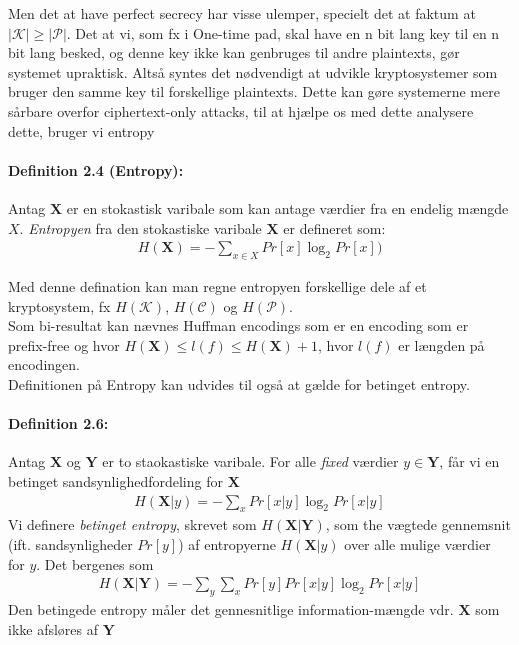 \documentclass[paper=a4, fontsize=11pt]{scrartcl} %
\numberwithin{equation}{section} %
\numberwithin{figure}{section} %
\numberwithin{table}{section} %
\begin{document}
	Men det at have perfect secrecy har visse ulemper, specielt det at faktum at $|\mathcal{K}|\geq|\mathcal{P}|$. Det at vi, som fx i One-time pad, skal have en n bit lang key til en n bit lang besked, og denne key ikke kan genbruges til andre plaintexts, gør systemet upraktisk. Altså syntes det nødvendigt at udvikle kryptosystemer som bruger den samme key til forskellige plaintexts. Dette kan gøre systemerne mere sårbare overfor ciphertext-only attacks, til at hjælpe os med dette analysere dette, bruger vi entropy
	
	\paragraph{\textbf{Definition 2.4 (Entropy):}} Antag $\mathbf{X}$ er en stokastisk varibale som kan antage værdier fra en endelig mængde $X$. \textit{Entropyen} fra den stokastiske varibale $\mathbf{X}$ er defineret som:
	\begin{align*}
	H(\mathbf{X})=-\sum_{x\in X}Pr[x]\log_2 Pr[x])
	\end{align*}
	
	Med denne defination kan man regne entropyen forskellige dele af et kryptosystem, fx $H(\mathcal{K})$, $H(\mathcal{C})$ og $H(\mathcal{P})$. \\
	
	Som bi-resultat kan nævnes Huffman encodings som er en encoding som er prefix-free og hvor $H(\mathbf{X})\leq l(f)\leq H(\mathbf{X}) + 1$, hvor $l(f)$ er længden på encodingen. \\
	
	Definitionen på Entropy kan udvides til også at gælde for betinget entropy.
	
	\paragraph{\textbf{Definition 2.6:}} Antag $\mathbf{X}$ og $\mathbf{Y}$ er to staokastiske varibale. For alle \textit{fixed} værdier $y\in\mathbf{Y}$, får vi en betinget sandsynlighedfordeling for $\mathbf{X}$
	\begin{align*}
	H(\mathbf{X}|y)=-\sum_x Pr[x|y]\log_2 Pr[x|y]
	\end{align*}
	Vi definere \textit{betinget entropy}, skrevet som $H(\mathbf{X}|\mathbf{Y})$, som the vægtede gennemsnit (ift. sandsynligheder $Pr[y]$) af entropyerne $H(\mathbf{X}|y)$ over alle mulige værdier for $y$. Det bergenes som
	\begin{align*}
	H(\mathbf{X}|\mathbf{Y})=-\sum_y \sum_x Pr[y]Pr[x|y]\log_2 Pr[x|y]
	\end{align*}
	Den betingede entropy måler det gennesnitlige information-mængde vdr. $\mathbf{X}$ som ikke afsløres af $\mathbf{Y}$ \\
	
\end{document}
